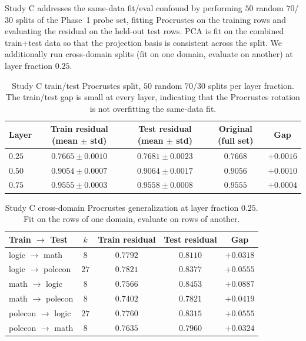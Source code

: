 Study C addresses the same-data fit/eval confound by performing $50$
random $70$/$30$ splits of the Phase~1 probe set, fitting Procrustes on
the training rows and evaluating the residual on the held-out test
rows. PCA is fit on the combined train+test data so that the projection
basis is consistent across the split. We additionally run cross-domain
splits (fit on one domain, evaluate on another) at layer fraction
$0.25$.

\begin{table}[h]
\centering
\caption{Study C train/test Procrustes split, $50$ random $70$/$30$
splits per layer fraction. The train/test gap is small at every layer,
indicating that the Procrustes rotation is not overfitting the same-data
fit.}
\label{tab:study-c-random}
\begin{tabular}{l c c c c}
\toprule
Layer & Train residual (mean $\pm$ std) & Test residual (mean $\pm$ std) & Original (full set) & Gap \\
\midrule
$0.25$ & $0.7665 \pm 0.0010$ & $0.7681 \pm 0.0023$ & $0.7668$ & $+0.0016$ \\
$0.50$ & $0.9054 \pm 0.0007$ & $0.9064 \pm 0.0017$ & $0.9056$ & $+0.0010$ \\
$0.75$ & $0.9555 \pm 0.0003$ & $0.9558 \pm 0.0008$ & $0.9555$ & $+0.0004$ \\
\bottomrule
\end{tabular}
\end{table}

\begin{table}[h]
\centering
\caption{Study C cross-domain Procrustes generalization at layer
fraction $0.25$. Fit on the rows of one domain, evaluate on rows of
another.}
\label{tab:study-c-cross}
\begin{tabular}{l c c c c}
\toprule
Train $\to$ Test & $k$ & Train residual & Test residual & Gap \\
\midrule
logic $\to$ math    & $8$  & $0.7792$ & $0.8110$ & $+0.0318$ \\
logic $\to$ polecon & $27$ & $0.7821$ & $0.8377$ & $+0.0555$ \\
math $\to$ logic    & $8$  & $0.7566$ & $0.8453$ & $+0.0887$ \\
math $\to$ polecon  & $8$  & $0.7402$ & $0.7821$ & $+0.0419$ \\
polecon $\to$ logic & $27$ & $0.7760$ & $0.8315$ & $+0.0555$ \\
polecon $\to$ math  & $8$  & $0.7635$ & $0.7960$ & $+0.0324$ \\
\bottomrule
\end{tabular}
\end{table}

